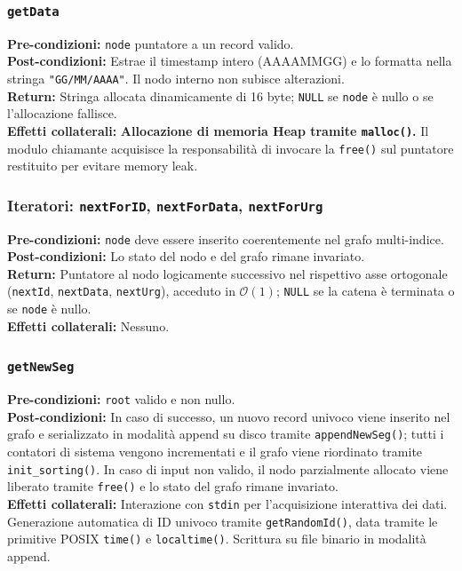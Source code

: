 \documentclass[12pt, a4paper]{article}
\begin{document}
\subsubsection{\texttt{getData}}
\vspace{3mm}
\begin{specbox}
\textbf{Pre-condizioni:} \texttt{node} puntatore a un record valido. \\
\textbf{Post-condizioni:} Estrae il timestamp intero (AAAAMMGG) e lo formatta nella stringa \texttt{"GG/MM/AAAA"}. Il nodo interno non subisce alterazioni. \\
\textbf{Return:} Stringa allocata dinamicamente di 16 byte; \texttt{NULL} se \texttt{node} è nullo o se l'allocazione fallisce. \\
\textbf{Effetti collaterali:} \textbf{Allocazione di memoria Heap tramite \texttt{malloc()}.} Il modulo chiamante acquisisce la responsabilità di invocare la \texttt{free()} sul puntatore restituito per evitare memory leak.
\end{specbox}

\subsubsection{Iteratori: \texttt{nextForID}, \texttt{nextForData}, \texttt{nextForUrg}}
\vspace{3mm}
\begin{specbox}
\textbf{Pre-condizioni:} \texttt{node} deve essere inserito coerentemente nel grafo multi-indice. \\
\textbf{Post-condizioni:} Lo stato del nodo e del grafo rimane invariato. \\
\textbf{Return:} Puntatore al nodo logicamente successivo nel rispettivo asse ortogonale (\texttt{nextId}, \texttt{nextData}, \texttt{nextUrg}), acceduto in $\mathcal{O}(1)$; \texttt{NULL} se la catena è terminata o se \texttt{node} è nullo. \\
\textbf{Effetti collaterali:} Nessuno.
\end{specbox}

\subsubsection{\texttt{getNewSeg}}
\vspace{3mm}
\begin{specbox}
\textbf{Pre-condizioni:} \texttt{root} valido e non nullo. \\
\textbf{Post-condizioni:} In caso di successo, un nuovo record univoco viene inserito nel grafo e serializzato in modalità append su disco tramite \texttt{appendNewSeg()}; tutti i contatori di sistema vengono incrementati e il grafo viene riordinato tramite \texttt{init\_sorting()}. In caso di input non valido, il nodo parzialmente allocato viene liberato tramite \texttt{free()} e lo stato del grafo rimane invariato. \\
\textbf{Effetti collaterali:} Interazione con \texttt{stdin} per l'acquisizione interattiva dei dati. Generazione automatica di ID univoco tramite \texttt{getRandomId()}, data tramite le primitive POSIX \texttt{time()} e \texttt{localtime()}. Scrittura su file binario in modalità append.
\end{specbox}
\end{document}
